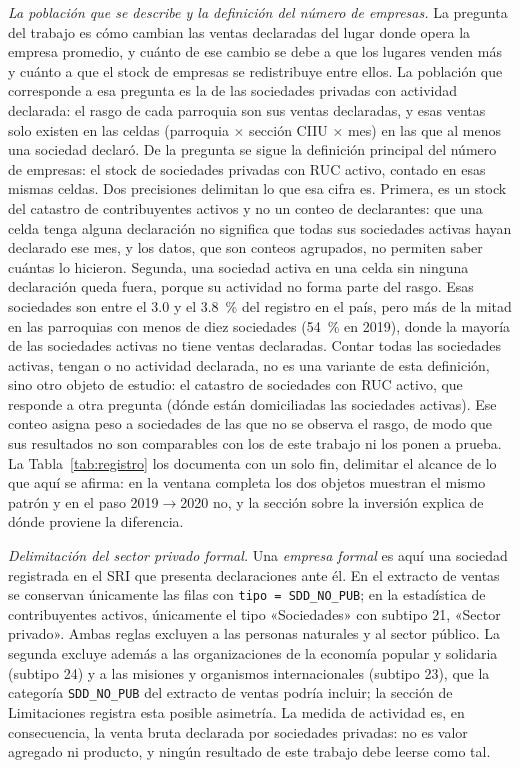 \documentclass[12pt,a4paper]{article}
\begin{document}
\textit{La población que se describe y la definición del número de empresas.} La pregunta del trabajo es cómo cambian las ventas declaradas del lugar donde opera la empresa promedio, y cuánto de ese cambio se debe a que los lugares venden más y cuánto a que el stock de empresas se redistribuye entre ellos. La población que corresponde a esa pregunta es la de las sociedades privadas con actividad declarada: el rasgo de cada parroquia son sus ventas declaradas, y esas ventas solo existen en las celdas (parroquia $\times$ sección CIIU $\times$ mes) en las que al menos una sociedad declaró. De la pregunta se sigue la definición principal del número de empresas: el stock de sociedades privadas con RUC activo, contado en esas mismas celdas. Dos precisiones delimitan lo que esa cifra es. Primera, es un stock del catastro de contribuyentes activos y no un conteo de declarantes: que una celda tenga alguna declaración no significa que todas sus sociedades activas hayan declarado ese mes, y los datos, que son conteos agrupados, no permiten saber cuántas lo hicieron. Segunda, una sociedad activa en una celda sin ninguna declaración queda fuera, porque su actividad no forma parte del rasgo. Esas sociedades son entre el 3.0 y el 3.8~\% del registro en el país, pero más de la mitad en las parroquias con menos de diez sociedades (54~\% en 2019), donde la mayoría de las sociedades activas no tiene ventas declaradas. Contar todas las sociedades activas, tengan o no actividad declarada, no es una variante de esta definición, sino otro objeto de estudio: el catastro de sociedades con RUC activo, que responde a otra pregunta (dónde están domiciliadas las sociedades activas). Ese conteo asigna peso a sociedades de las que no se observa el rasgo, de modo que sus resultados no son comparables con los de este trabajo ni los ponen a prueba. La Tabla~\ref{tab:registro} los documenta con un solo fin, delimitar el alcance de lo que aquí se afirma: en la ventana completa los dos objetos muestran el mismo patrón y en el paso 2019$\to$2020 no, y la sección sobre la inversión explica de dónde proviene la diferencia.
\par\vspace{6pt}
\textit{Delimitación del sector privado formal.} Una \textit{empresa formal} es aquí una sociedad registrada en el SRI que presenta declaraciones ante él. En el extracto de ventas se conservan únicamente las filas con \texttt{tipo = SDD\_NO\_PUB}; en la estadística de contribuyentes activos, únicamente el tipo «Sociedades» con subtipo 21, «Sector privado». Ambas reglas excluyen a las personas naturales y al sector público. La segunda excluye además a las organizaciones de la economía popular y solidaria (subtipo 24) y a las misiones y organismos internacionales (subtipo 23), que la categoría \texttt{SDD\_NO\_PUB} del extracto de ventas podría incluir; la sección de Limitaciones registra esta posible asimetría. La medida de actividad es, en consecuencia, la venta bruta declarada por sociedades privadas: no es valor agregado ni producto, y ningún resultado de este trabajo debe leerse como tal.
\end{document}

